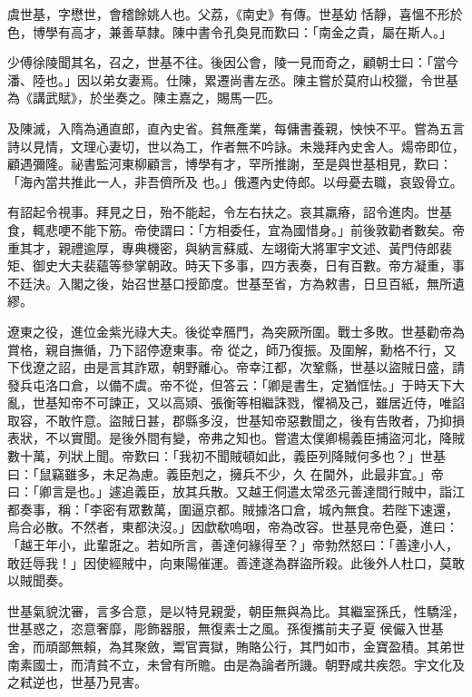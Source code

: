 \begin{pinyinscope}
 虞世基，字懋世，會稽餘姚人也。父荔，《南史》有傳。世基幼
 恬靜，喜慍不形於色，博學有高才，兼善草隸。陳中書令孔奐見而歎曰：「南金之貴，屬在斯人。」



 少傅徐陵聞其名，召之，世基不往。後因公會，陵一見而奇之，顧朝士曰：「當今潘、陸也。」因以弟女妻焉。仕陳，累遷尚書左丞。陳主嘗於莫府山校獵，令世基為《講武賦》，於坐奏之。陳主嘉之，賜馬一匹。



 及陳滅，入隋為通直郎，直內史省。貧無產業，每傭書養親，怏怏不平。嘗為五言詩以見情，文理心妻切，世以為工，作者無不吟詠。未幾拜內史舍人。煬帝即位，顧遇彌隆。祕書監河東柳顧言，博學有才，罕所推謝，至是與世基相見，歎曰：「海內當共推此一人，非吾儕所及
 也。」俄遷內史侍郎。以母憂去職，哀毀骨立。



 有詔起令視事。拜見之日，殆不能起，令左右扶之。哀其羸瘠，詔令進肉。世基食，輒悲哽不能下筋。帝使謂曰：「方相委任，宜為國惜身。」前後敦勸者數矣。帝重其才，親禮逾厚，專典機密，與納言蘇威、左翊衛大將軍宇文述、黃門侍郎裴矩、御史大夫裴蘊等參掌朝政。時天下多事，四方表奏，日有百數。帝方凝重，事不廷決。入閣之後，始召世基口授節度。世基至省，方為敕書，日旦百紙，無所遺繆。



 遼東之役，進位金紫光祿大夫。後從幸鴈門，為突厥所圍。戰士多敗。世基勸帝為賞格，親自撫循，乃下詔停遼東事。帝
 從之，師乃復振。及圍解，勳格不行，又下伐遼之詔，由是言其詐眾，朝野離心。帝幸江都，次鞏縣，世基以盜賊日盛，請發兵屯洛口倉，以備不虞。帝不從，但答云：「卿是書生，定猶恇怯。」于時天下大亂，世基知帝不可諫正，又以高熲、張衡等相繼誅戮，懼禍及己，雖居近侍，唯諂取容，不敢忤意。盜賊日甚，郡縣多沒，世基知帝惡數聞之，後有告敗者，乃抑損表狀，不以實聞。是後外間有變，帝弗之知也。嘗遣太僕卿楊義臣捕盜河北，降賊數十萬，列狀上聞。帝歎曰：「我初不聞賊頓如此，義臣列降賊何多也？」世基曰：「鼠竊雖多，未足為慮。義臣剋之，擁兵不少，久
 在閫外，此最非宜。」帝曰：「卿言是也。」遽追義臣，放其兵散。又越王侗遣太常丞元善達間行賊中，詣江都奏事，稱：「李密有眾數萬，圍逼京都。賊據洛口倉，城內無食。若陛下速還，烏合必散。不然者，東都決沒。」因歔欷嗚咽，帝為改容。世基見帝色憂，進曰：「越王年小，此輩誑之。若如所言，善達何緣得至？」帝勃然怒曰：「善達小人，敢廷辱我！」因使經賊中，向東陽催運。善達遂為群盜所殺。此後外人杜口，莫敢以賊聞奏。



 世基氣貌沈審，言多合意，是以特見親愛，朝臣無與為比。其繼室孫氏，性驕淫，世基惑之，恣意奢靡，彫飾器服，無復素士之風。孫復攜前夫子夏
 侯儼入世基舍，而頑鄙無賴，為其聚斂，鬻官賣獄，賄賂公行，其門如市，金寶盈積。其弟世南素國士，而清貧不立，未曾有所贍。由是為論者所譏。朝野咸共疾怨。宇文化及之弒逆也，世基乃見害。




\end{pinyinscope}
